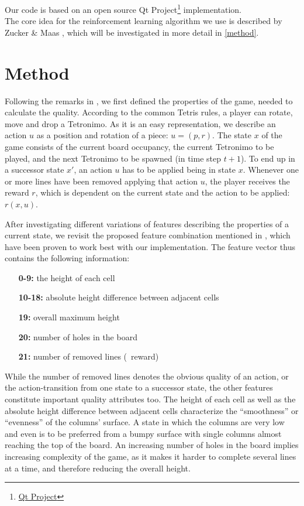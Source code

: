 \documentclass{ml}
\begin{document}
Our code is based on an open source Qt Project\footnote{\href{https://qt-project.org/doc/qt-4.8/widgets-tetrix.html}{Qt Project}} implementation. \\
The core idea for the reinforcement learning algorithm we use is described by Zucker \& Maas \cite{zucker2009learning}, which will be investigated in more detail in \autoref{method}.


\section{Method}
\label{method}

Following the remarks in \cite{zucker2009learning}, we first defined the properties of the game, needed to calculate the quality.
According to the common Tetris rules, a player can rotate, move and drop a Tetronimo. As it is an easy representation, we describe an action $u$ as a position and rotation of a piece: $u = (p,r)$. The state $x$ of the game consists of the current board occupancy, the current Tetronimo to be played, and the next Tetronimo to be spawned (in time step $t+1$). 
To end up in a successor state $x'$, an action $u$ has to be applied being in state $x$. 
Whenever one or more lines have been removed applying that action $u$, the player receives the reward $r$, which is dependent on the current state and the action to be applied: $r(x,u)$.

After investigating different variations of features describing the properties of a current state, we revisit the proposed feature combination mentioned in \cite{zucker2009learning}, which have been proven to work best with our implementation. 
The feature vector thus contains the following information:
\begin{enumerate}
	\item[\textbf{0-9:}] the height of each cell
	\item[\textbf{10-18:}] absolute height difference between adjacent cells
	\item[\textbf{19:}] overall maximum height 
	\item[\textbf{20:}] number of holes in the board
	\item[\textbf{21:}] number of removed lines (\Corresponds~reward)
\end{enumerate}
While the number of removed lines denotes the obvious quality of an action, or the action-transition from one state to a successor state, the other features constitute important quality attributes too. 
The height of each cell as well as the absolute height difference between adjacent cells characterize the ``smoothness'' or ``evenness'' of the columns' surface. 
A state in which the columns are very low and even is to be preferred from a bumpy surface with single columns almost reaching the top of the board. 
An increasing number of holes in the board implies increasing complexity of the game, as it makes it harder to complete several lines at a time, and therefore reducing the overall height. 
\end{document}
